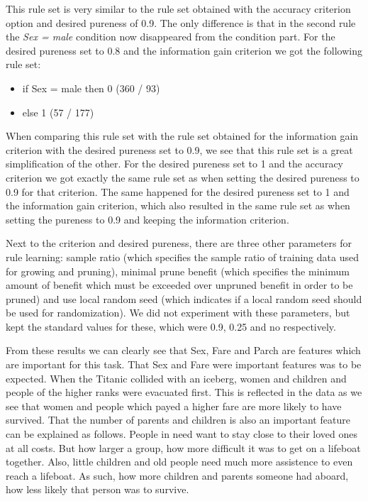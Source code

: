 \documentclass[11pt,a4paper]{article}
\begin{document}
\par This rule set is very similar to the rule set obtained with the accuracy criterion option and desired pureness of 0.9. The only difference is that in the second rule the \textit{Sex = male} condition now disappeared from the condition part. 
For the desired pureness set to 0.8 and the information gain criterion we got the following rule set:
\begin{itemize}

\item if Sex = male then 0  (360 / 93)
\item else 1  (57 / 177)

\end{itemize}
\par When comparing this rule set with the rule set obtained for the information gain criterion with the desired pureness set to 0.9, we see that this rule set is a great simplification of the other. For the desired pureness set to 1 and the accuracy criterion we got exactly the same rule set as when setting the desired pureness to 0.9 for that criterion. The same happened for the desired pureness set to 1 and the information gain criterion, which also resulted in the same rule set as when setting the pureness to 0.9 and keeping the information criterion.
\par Next to the criterion and desired pureness, there are three other parameters for rule learning: sample ratio (which specifies the sample ratio of training data used for growing and pruning), minimal prune benefit (which specifies the minimum amount of benefit which must be exceeded over unpruned benefit in order to be pruned) and use local random seed (which indicates if a local random seed should be used for randomization). We did not experiment with these parameters, but kept the standard values for these, which were 0.9, 0.25 and no respectively.
\par From these results we can clearly see that Sex, Fare and Parch are features which are important for this task. That Sex and Fare were important features was to be expected. When the Titanic collided with an iceberg, women and children and people of the higher ranks were evacuated first. This is reflected in the data as we see that women and people which payed a higher fare are more likely to have survived. That the number of parents and children is also an important feature can be explained as follows. People in need want to stay close to their loved ones at all costs. But how larger a group, how more difficult it was to get on a lifeboat together. Also, little children and old people need much more assistence to even reach a lifeboat. As such, how more children and parents someone had aboard, how less likely that person was to survive.
\end{document}
